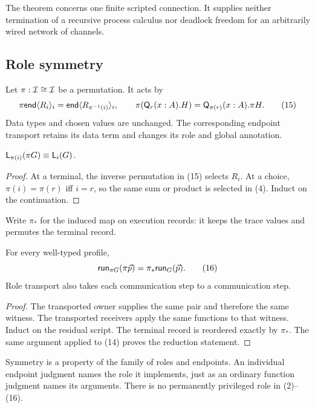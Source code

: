 The theorem concerns one finite scripted connection. It supplies neither
termination of a recursive process calculus nor deadlock freedom for an
arbitrarily wired network of channels.

\subsection{Role symmetry}

Let $\pi:\mathcal I\cong\mathcal I$ be a permutation. It acts by
\[
 \pi\mathsf{end}\langle R_i\rangle_i
   =\mathsf{end}\langle R_{\pi^{-1}(i)}\rangle_i,
 \qquad
 \pi(\mathsf Q_r(x:A).H)=\mathsf Q_{\pi(r)}(x:A).\pi H.
 \tag{15}
\]
Data types and chosen values are unchanged. The corresponding endpoint
transport retains its data term and changes its role and global annotation.

\begin{lemma}
\label{lem:role-transport}
$\mathsf L_{\pi(i)}(\pi G)\mathrel{\equiv}\mathsf L_{i}(G)$.
\end{lemma}
\begin{proof}
At a terminal, the inverse permutation in (15) selects $R_i$. At a choice,
$\pi(i)=\pi(r)$ iff $i=r$, so the same sum or product is selected in (4).
Induct on the continuation.
\end{proof}

Write $\pi_*$ for the induced map on execution records: it keeps the trace
values and permutes the terminal record.

\begin{theorem}[Equivariance]
\label{thm:equivariance}
For every well-typed profile,
\[
 \mathsf{run}_{\pi G}(\pi\vec p)=\pi_*\mathsf{run}_G(\vec p).
 \tag{16}
\]
Role transport also takes each communication step to a communication step.
\end{theorem}
\begin{proof}
The transported owner supplies the same pair and therefore the same witness.
The transported receivers apply the same functions to that witness. Induct on
the residual script. The terminal record is reordered exactly by $\pi_*$.
The same argument applied to (14) proves the reduction statement.
\end{proof}

Symmetry is a property of the family of roles and endpoints. An individual
endpoint judgment names the role it implements, just as an ordinary function
judgment names its arguments. There is no permanently privileged role in
(2)--(16).
